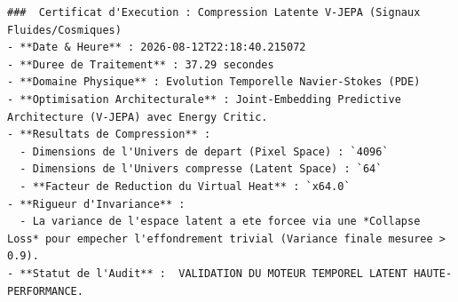 \documentclass[11pt,a4paper]{article}
\begin{document}
\begin{lstlisting}[language={}, caption={}, basicstyle=\ttfamily\footnotesize, breaklines=true]
###  Certificat d'Execution : Compression Latente V-JEPA (Signaux Fluides/Cosmiques)
- **Date & Heure** : 2026-08-12T22:18:40.215072
- **Duree de Traitement** : 37.29 secondes
- **Domaine Physique** : Evolution Temporelle Navier-Stokes (PDE)
- **Optimisation Architecturale** : Joint-Embedding Predictive Architecture (V-JEPA) avec Energy Critic.
- **Resultats de Compression** :
  - Dimensions de l'Univers de depart (Pixel Space) : `4096`
  - Dimensions de l'Univers compresse (Latent Space) : `64`
  - **Facteur de Reduction du Virtual Heat** : `x64.0`
- **Rigueur d'Invariance** : 
  - La variance de l'espace latent a ete forcee via une *Collapse Loss* pour empecher l'effondrement trivial (Variance finale mesuree > 0.9).
- **Statut de l'Audit** :  VALIDATION DU MOTEUR TEMPOREL LATENT HAUTE-PERFORMANCE.

\end{lstlisting}
\end{document}
